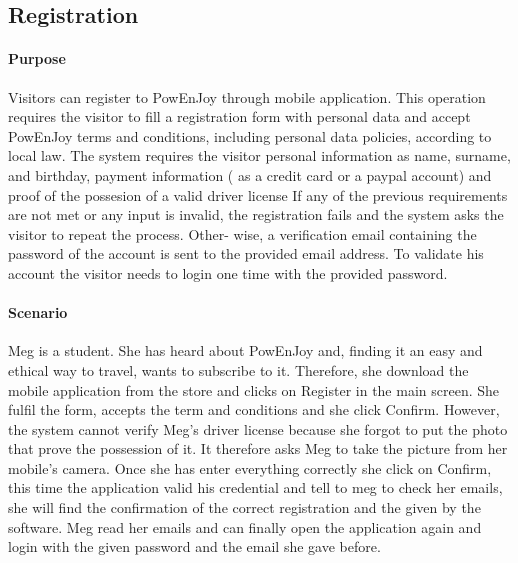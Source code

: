 \subsection{Registration}
\paragraph{Purpose}
Visitors can register to PowEnJoy through mobile application. This operation requires the visitor to fill a registration form with personal data and accept PowEnJoy terms and conditions, including personal data policies, according to local law. The system requires the visitor personal information as name, surname, and birthday, payment information ( as a credit card or a paypal account) and proof of the possesion of a valid driver license
If any of the previous requirements are not met or any input is invalid, the registration fails and the system asks the visitor to repeat the process. Other- wise, a verification email containing the password of the account is sent to the provided email address. To validate his account the visitor needs to login one time with the provided password.
\paragraph{Scenario}
Meg is a student. She has heard about PowEnJoy and, finding it an easy and ethical way to travel, wants to subscribe to it.
Therefore, she download the mobile application from the store and clicks on Register in the main screen. She fulfil the form, accepts the term and conditions  and she click Confirm. However, the system cannot verify Meg's driver license because she forgot to put the photo that prove the possession of it. It therefore asks Meg to take the picture from her mobile's camera. Once she has enter everything correctly she click on Confirm, this time the application valid his credential and tell to meg to check her emails, she will find the confirmation of the correct registration and the given by the software. Meg read her emails and can finally open the application again and login with the given password and the email she gave before.
